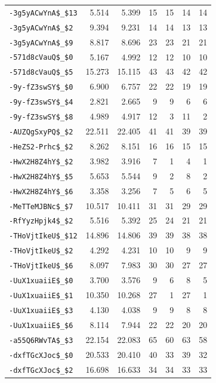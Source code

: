 \begin{longtable}{lrrrrrr}
\nolinkurl{-3g5yACwYnA$_$13} & 5.514 & 5.399 & 15 & 15 & 14 & 14\\
\nolinkurl{-3g5yACwYnA$_$2} & 9.394 & 9.231 & 14 & 14 & 13 & 13\\
\nolinkurl{-3g5yACwYnA$_$9} & 8.817 & 8.696 & 23 & 23 & 21 & 21\\
\nolinkurl{-571d8cVauQ$_$0} & 5.167 & 4.992 & 12 & 12 & 10 & 10\\
\nolinkurl{-571d8cVauQ$_$5} & 15.273 & 15.115 & 43 & 43 & 42 & 42\\
\nolinkurl{-9y-fZ3swSY$_$0} & 6.900 & 6.757 & 22 & 22 & 19 & 19\\
\nolinkurl{-9y-fZ3swSY$_$4} & 2.821 & 2.665 & 9 & 9 & 6 & 6\\
\nolinkurl{-9y-fZ3swSY$_$8} & 4.989 & 4.917 & 12 & 3 & 11 & 2\\
\nolinkurl{-AUZQgSxyPQ$_$2} & 22.511 & 22.405 & 41 & 41 & 39 & 39\\
\nolinkurl{-HeZS2-Prhc$_$2} & 8.262 & 8.151 & 16 & 16 & 15 & 15\\
\nolinkurl{-HwX2H8Z4hY$_$2} & 3.982 & 3.916 & 7 & 1 & 4 & 1\\
\nolinkurl{-HwX2H8Z4hY$_$5} & 5.653 & 5.544 & 9 & 2 & 8 & 2\\
\nolinkurl{-HwX2H8Z4hY$_$6} & 3.358 & 3.256 & 7 & 5 & 6 & 5\\
\nolinkurl{-MeTTeMJBNc$_$7} & 10.517 & 10.411 & 31 & 31 & 29 & 29\\
\nolinkurl{-RfYyzHpjk4$_$2} & 5.516 & 5.392 & 25 & 24 & 21 & 21\\
\nolinkurl{-THoVjtIkeU$_$12} & 14.896 & 14.806 & 39 & 39 & 38 & 38\\
\nolinkurl{-THoVjtIkeU$_$2} & 4.292 & 4.231 & 10 & 10 & 9 & 9\\
\nolinkurl{-THoVjtIkeU$_$6} & 8.097 & 7.983 & 30 & 30 & 27 & 27\\
\nolinkurl{-UuX1xuaiiE$_$0} & 3.700 & 3.576 & 9 & 6 & 8 & 5\\
\nolinkurl{-UuX1xuaiiE$_$1} & 10.350 & 10.268 & 27 & 1 & 27 & 1\\
\nolinkurl{-UuX1xuaiiE$_$3} & 4.130 & 4.038 & 9 & 9 & 8 & 8\\
\nolinkurl{-UuX1xuaiiE$_$6} & 8.114 & 7.944 & 22 & 22 & 20 & 20\\
\nolinkurl{-a55Q6RWvTA$_$3} & 22.154 & 22.083 & 65 & 60 & 63 & 58\\
\nolinkurl{-dxfTGcXJoc$_$0} & 20.533 & 20.410 & 40 & 33 & 39 & 32\\
\nolinkurl{-dxfTGcXJoc$_$2} & 16.698 & 16.633 & 34 & 34 & 33 & 33\\

\end{longtable}

